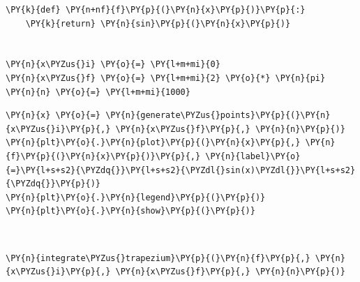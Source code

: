     \begin{tcolorbox}[breakable, size=fbox, boxrule=1pt, pad at break*=1mm,colback=cellbackground, colframe=cellborder]
\begin{Verbatim}[commandchars=\\\{\}]
\PY{k}{def} \PY{n+nf}{f}\PY{p}{(}\PY{n}{x}\PY{p}{)}\PY{p}{:}
    \PY{k}{return} \PY{n}{sin}\PY{p}{(}\PY{n}{x}\PY{p}{)}


\PY{n}{x\PYZus{}i} \PY{o}{=} \PY{l+m+mi}{0}
\PY{n}{x\PYZus{}f} \PY{o}{=} \PY{l+m+mi}{2} \PY{o}{*} \PY{n}{pi}
\PY{n}{n} \PY{o}{=} \PY{l+m+mi}{1000}
\end{Verbatim}
\end{tcolorbox}

    \begin{tcolorbox}[breakable, size=fbox, boxrule=1pt, pad at break*=1mm,colback=cellbackground, colframe=cellborder]
\begin{Verbatim}[commandchars=\\\{\}]
\PY{n}{x} \PY{o}{=} \PY{n}{generate\PYZus{}points}\PY{p}{(}\PY{n}{x\PYZus{}i}\PY{p}{,} \PY{n}{x\PYZus{}f}\PY{p}{,} \PY{n}{n}\PY{p}{)}
\PY{n}{plt}\PY{o}{.}\PY{n}{plot}\PY{p}{(}\PY{n}{x}\PY{p}{,} \PY{n}{f}\PY{p}{(}\PY{n}{x}\PY{p}{)}\PY{p}{,} \PY{n}{label}\PY{o}{=}\PY{l+s+s2}{\PYZdq{}}\PY{l+s+s2}{\PYZdl{}sin(x)\PYZdl{}}\PY{l+s+s2}{\PYZdq{}}\PY{p}{)}
\PY{n}{plt}\PY{o}{.}\PY{n}{legend}\PY{p}{(}\PY{p}{)}
\PY{n}{plt}\PY{o}{.}\PY{n}{show}\PY{p}{(}\PY{p}{)}
\end{Verbatim}
\end{tcolorbox}

    \begin{center}
    \end{center}
    { \hspace*{\fill} \\}
    
    \begin{tcolorbox}[breakable, size=fbox, boxrule=1pt, pad at break*=1mm,colback=cellbackground, colframe=cellborder]
\begin{Verbatim}[commandchars=\\\{\}]
\PY{n}{integrate\PYZus{}trapezium}\PY{p}{(}\PY{n}{f}\PY{p}{,} \PY{n}{x\PYZus{}i}\PY{p}{,} \PY{n}{x\PYZus{}f}\PY{p}{,} \PY{n}{n}\PY{p}{)}
\end{Verbatim}
\end{tcolorbox}

